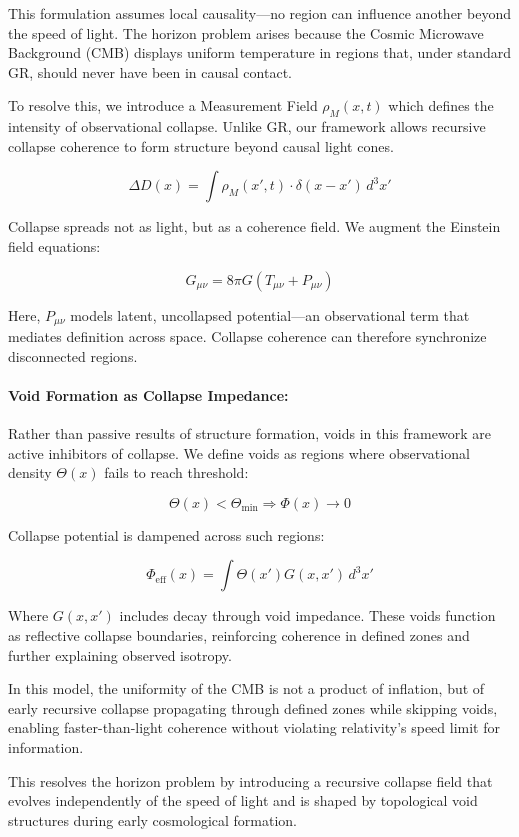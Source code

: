 This formulation assumes local causality—no region can influence another beyond the speed of light. The horizon problem arises because the Cosmic Microwave Background (CMB) displays uniform temperature in regions that, under standard GR, should never have been in causal contact.

To resolve this, we introduce a Measurement Field \( \rho_M(x, t) \) which defines the intensity of observational collapse. Unlike GR, our framework allows recursive collapse coherence to form structure beyond causal light cones.

\[ \Delta D(x) = \int \rho_M(x', t) \cdot \delta(x - x') \, d^3x' \]

Collapse spreads not as light, but as a coherence field. We augment the Einstein field equations:

\[ G_{\mu\nu} = 8\pi G (T_{\mu\nu} + P_{\mu\nu}) \]

Here, \( P_{\mu\nu} \) models latent, uncollapsed potential—an observational term that mediates definition across space. Collapse coherence can therefore synchronize disconnected regions.

\paragraph{Void Formation as Collapse Impedance:}
Rather than passive results of structure formation, voids in this framework are active inhibitors of collapse. We define voids as regions where observational density \( \Theta(x) \) fails to reach threshold:

\[ \Theta(x) < \Theta_{\text{min}} \Rightarrow \Phi(x) \rightarrow 0 \]

Collapse potential is dampened across such regions:

\[ \Phi_{\text{eff}}(x) = \int \Theta(x') G(x, x') \, d^3x' \]

Where \( G(x, x') \) includes decay through void impedance. These voids function as reflective collapse boundaries, reinforcing coherence in defined zones and further explaining observed isotropy.

In this model, the uniformity of the CMB is not a product of inflation, but of early recursive collapse propagating through defined zones while skipping voids, enabling faster-than-light coherence without violating relativity's speed limit for information.

\vspace{1em}
This resolves the horizon problem by introducing a recursive collapse field that evolves independently of the speed of light and is shaped by topological void structures during early cosmological formation.

